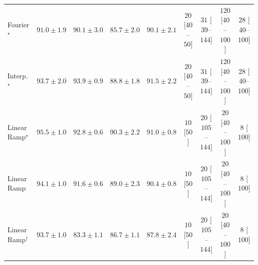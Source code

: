 \begin{tabular}{l|cccc|cccc|}
Fourier$^\star$ & {\cellcolor[HTML]{076D39}} \color[HTML]{F1F1F1} $91.0\pm 1.9$ & {\cellcolor[HTML]{0C723B}} \color[HTML]{F1F1F1} $90.1\pm 3.0$ & {\cellcolor[HTML]{278946}} \color[HTML]{F1F1F1} $85.7\pm 2.0$ & {\cellcolor[HTML]{0C723B}} \color[HTML]{F1F1F1} $90.1\pm 2.1$ & {\cellcolor[HTML]{FFF4F0}} \color[HTML]{000000} $20$ [$40$--$50$] & {\cellcolor[HTML]{FFF2EE}} \color[HTML]{000000} $31$ [$39$--$144$] & {\cellcolor[HTML]{FDDCD8}} \color[HTML]{000000} $120$ [$40$--$100$] & {\cellcolor[HTML]{FFF3EF}} \color[HTML]{000000} $28$ [$40$--$100$] \\
Interp.$^\star$ & {\cellcolor[HTML]{005E33}} \color[HTML]{F1F1F1} $93.7\pm 2.0$ & {\cellcolor[HTML]{005D33}} \color[HTML]{F1F1F1} $93.9\pm 0.9$ & {\cellcolor[HTML]{15793E}} \color[HTML]{F1F1F1} $88.8\pm 1.8$ & {\cellcolor[HTML]{056C39}} \color[HTML]{F1F1F1} $91.5\pm 2.2$ & {\cellcolor[HTML]{FFF4F0}} \color[HTML]{000000} $20$ [$40$--$50$] & {\cellcolor[HTML]{FFF2EE}} \color[HTML]{000000} $31$ [$39$--$144$] & {\cellcolor[HTML]{FDDCD8}} \color[HTML]{000000} $120$ [$40$--$100$] & {\cellcolor[HTML]{FFF3EF}} \color[HTML]{000000} $28$ [$40$--$100$] \\
Linear Ramp$^\star$ & {\cellcolor[HTML]{00532F}} \color[HTML]{F1F1F1} $95.5\pm 1.0$ & {\cellcolor[HTML]{006435}} \color[HTML]{F1F1F1} $92.8\pm 0.6$ & {\cellcolor[HTML]{0B713B}} \color[HTML]{F1F1F1} $90.3\pm 2.2$ & {\cellcolor[HTML]{076D39}} \color[HTML]{F1F1F1} $91.0\pm 0.8$ & {\cellcolor[HTML]{FFF7F3}} \color[HTML]{000000} $10$ [$50$] & {\cellcolor[HTML]{FFF4F0}} \color[HTML]{000000} $20$ [$105$--$144$] & {\cellcolor[HTML]{FFF4F0}} \color[HTML]{000000} $20$ [$40$--$100$] & {\cellcolor[HTML]{FFF7F3}} \color[HTML]{000000} $8$ [$100$] \\
Linear Ramp & {\cellcolor[HTML]{005C32}} \color[HTML]{F1F1F1} $94.1\pm 1.0$ & {\cellcolor[HTML]{036B38}} \color[HTML]{F1F1F1} $91.6\pm 0.6$ & {\cellcolor[HTML]{13773D}} \color[HTML]{F1F1F1} $89.0\pm 2.3$ & {\cellcolor[HTML]{0B713B}} \color[HTML]{F1F1F1} $90.4\pm 0.8$ & {\cellcolor[HTML]{FFF7F3}} \color[HTML]{000000} $10$ [$50$] & {\cellcolor[HTML]{FFF4F0}} \color[HTML]{000000} $20$ [$105$--$144$] & {\cellcolor[HTML]{FFF4F0}} \color[HTML]{000000} $20$ [$40$--$100$] & {\cellcolor[HTML]{FFF7F3}} \color[HTML]{000000} $8$ [$100$] \\
Linear Ramp$^\dagger$ & {\cellcolor[HTML]{005E33}} \color[HTML]{F1F1F1} $93.7\pm 1.0$ & {\cellcolor[HTML]{339951}} \color[HTML]{F1F1F1} $83.3\pm 1.1$ & {\cellcolor[HTML]{218242}} \color[HTML]{F1F1F1} $86.7\pm 1.1$ & {\cellcolor[HTML]{1A7D40}} \color[HTML]{F1F1F1} $87.8\pm 2.4$ & {\cellcolor[HTML]{FFF7F3}} \color[HTML]{000000} $10$ [$50$] & {\cellcolor[HTML]{FFF4F0}} \color[HTML]{000000} $20$ [$105$--$144$] & {\cellcolor[HTML]{FFF4F0}} \color[HTML]{000000} $20$ [$40$--$100$] & {\cellcolor[HTML]{FFF7F3}} \color[HTML]{000000} $8$ [$100$] \\

\end{tabular}
